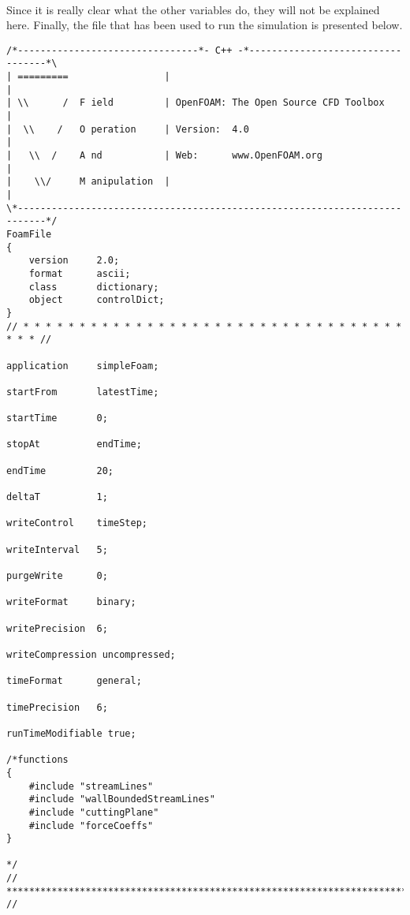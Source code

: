 \paragraph{}Since it is really clear what the other variables do, they will not be explained here. Finally, the file that has been used to run the simulation is presented below.

\begin{footnotesize}
\begin{verbatim}
/*--------------------------------*- C++ -*----------------------------------*\
| =========                 |                                                 |
| \\      /  F ield         | OpenFOAM: The Open Source CFD Toolbox           |
|  \\    /   O peration     | Version:  4.0                                   |
|   \\  /    A nd           | Web:      www.OpenFOAM.org                      |
|    \\/     M anipulation  |                                                 |
\*---------------------------------------------------------------------------*/
FoamFile
{
    version     2.0;
    format      ascii;
    class       dictionary;
    object      controlDict;
}
// * * * * * * * * * * * * * * * * * * * * * * * * * * * * * * * * * * * * * //

application     simpleFoam;

startFrom       latestTime;

startTime       0;

stopAt          endTime;

endTime         20;

deltaT          1;

writeControl    timeStep;

writeInterval   5;

purgeWrite      0;

writeFormat     binary;

writePrecision  6;

writeCompression uncompressed;

timeFormat      general;

timePrecision   6;

runTimeModifiable true;

/*functions
{
    #include "streamLines"
    #include "wallBoundedStreamLines"
    #include "cuttingPlane"
    #include "forceCoeffs"
}

*/
// ************************************************************************* //

\end{verbatim}
\end{footnotesize}